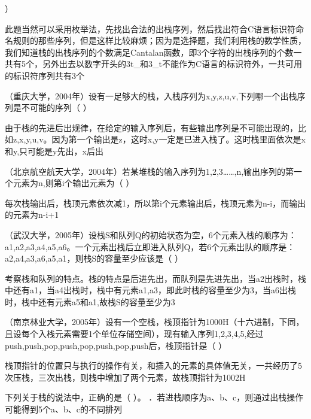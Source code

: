 ）
\par{}
\begin{solution}此题当然可以采用枚举法，先找出合法的出栈序列，然后找出符合C语言标识符命名规则的那些序列，但是这样比较麻烦；因为是选择题，我们利用栈的数学性质，我们知道栈的出栈序列的个数满足Cantalan函数，即3个字符的出栈序列的个数一共有5个，另外出去以数字开头的3t\_和3\_t不能作为C语言的标识符外，一共可用的标识符序列共有3个
\end{solution}
\question （重庆大学，2004年）设有一足够大的栈，入栈序列为x,y,z,u,v,下列哪一个出栈序列是不可能的序列（
）
\par{}
\begin{solution}由于栈的先进后出规律，在给定的输入序列后，有些输出序列是不可能出现的，比如z,x,y,u,v。因为第一个输出是z，这时x,y一定是已进入栈了。这时栈里面依次是x和y,只可能是y先出，x后出
\end{solution}
\question （北京航空航天大学，2004年）若某堆栈的输入序列为1,2,3\ldots{}\ldots{},n,输出序列的第一个元素为n,则第i个输出元素为（
）
\par{}
\begin{solution}每次栈输出后，栈顶元素依次减1，所以第i个元素输出后，栈顶元素为n-i，而输出的元素为n-i+1
\end{solution}
\question （武汉大学，2005年）设栈S和队列Q的初始状态为空，6个元素入栈的顺序为：a1,a2,a3,a4,a5,a6。一个元素出栈后立即进入队列Q，若6个元素出队的顺序是：a2,a4,a3,a6,a5,a1，则栈S的容量至少应该是（
）
\par{}
\begin{solution}考察栈和队列的特点。栈的特点是后进先出，而队列是先进先出，当a2出栈时，栈中还有a1，当a4出栈时，栈中有元素a1,a3，即此时栈的容量至少为3，当a6出栈时，栈中还有元素a5和a1,故栈S的容量至少为3
\end{solution}
\question （南京林业大学，2005年）设有一个空栈，栈顶指针为1000H（十六进制，下同，且设每个入栈元素需要1个单位存储空间），现有输入序列1,2,3,4,5,经过push,push,pop,push,pop,push,pop,push后，栈顶指针是（
）
\par{}
\begin{solution}栈顶指针的位置只与执行的操作有关，和插入的元素的具体值无关，一共经历了5次压栈，三次出栈，则栈中增加了两个元素，故栈顶指针为1002H
\end{solution}
\question 下列关于栈的说法中，正确的是（ ）。
．若进栈顺序为a、b、c，则通过出栈操作可能得到5个a、b、c的不同排列
